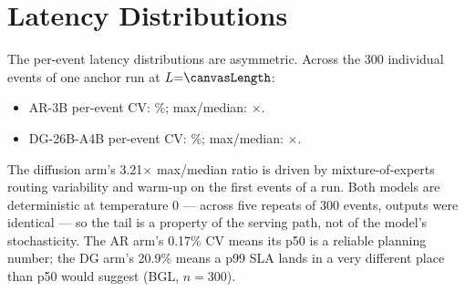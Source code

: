 \section{Latency Distributions}
\label{app:distributions} The per-event latency distributions are asymmetric. Across the 300 individual
events of one anchor run at $L{=}\canvasLength$:
\begin{itemize}[nosep]
\item AR-3B per-event CV: \arEventCV\%; max/median: \arMaxMed$\times$.
\item DG-26B-A4B per-event CV: \dgEventCV\%; max/median: \dgMaxMed$\times$.
\end{itemize}
The diffusion arm's 3.21$\times$ max/median ratio is driven by
mixture-of-experts routing variability and warm-up on the first events of a
run. Both models are deterministic at temperature 0 --- across five repeats of
300 events, outputs were identical --- so the tail is a property of the
serving path, not of the model's stochasticity. The AR arm's 0.17\% CV means
its p50 is a reliable planning number; the DG arm's 20.9\% means a p99 SLA
lands in a very different place than p50 would suggest
(BGL, $n{=}300$).
